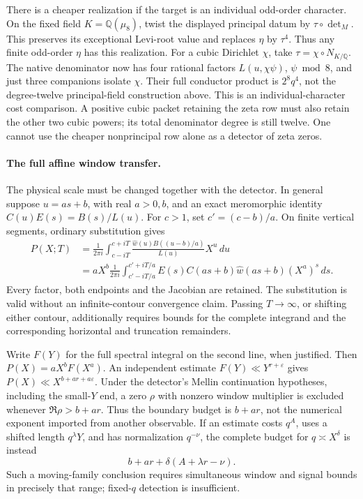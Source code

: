 There is a cheaper realization if the target is an individual
odd-order character. On the fixed field \(K=\mathbb Q(\mu_8)\),
twist the displayed principal datum by \(\tau\circ\det_M\).
This preserves its exceptional Levi-root value and replaces \(\eta\)
by \(\tau^4\). Thus any finite odd-order \(\eta\) has this realization.
For a cubic Dirichlet \(\chi\), take
\(\tau=\chi\circ N_{K/\mathbb Q}\). The native denominator now has
four rational factors \(L(u,\chi\psi)\), \(\psi\bmod8\), and just
three companions isolate \(\chi\). Their full conductor product is
\(2^8q^4\), not the degree-twelve principal-field construction above.
This is an individual-character cost comparison. A positive cubic
packet retaining the zeta row must also retain the other two cubic
powers; its total denominator degree is still twelve. One cannot use
the cheaper nonprincipal row alone as a detector of zeta zeros.

\paragraph{The full affine window transfer.}
The physical scale must be changed together with the detector.
In general suppose \(u=as+b\), with real \(a>0,b\), and an exact
meromorphic identity \(C(u)E(s)=B(s)/L(u)\).
For \(c>1\), set \(c'=(c-b)/a\). On finite vertical segments,
ordinary substitution gives
\begin{align*}
 P(X;T)&=\frac1{2\pi i}\int_{c-iT}^{c+iT}
    \frac{\widehat w(u)B((u-b)/a)}{L(u)}X^u\,du\\
 &=aX^b\frac1{2\pi i}
   \int_{c'-iT/a}^{c'+iT/a}
      E(s)C(as+b)\widehat w(as+b)(X^a)^s\,ds.
\end{align*}
Every factor, both endpoints and the Jacobian are retained.
The substitution is valid without an infinite-contour convergence
claim. Passing \(T\to\infty\), or shifting either contour, additionally
requires bounds for the complete integrand and the corresponding
horizontal and truncation remainders.

Write \(F(Y)\) for the full spectral integral on the second line,
when justified. Then \(P(X)=aX^bF(X^a)\).
An independent estimate \(F(Y)\ll Y^{r+\varepsilon}\) gives
\(P(X)\ll X^{b+ar+a\varepsilon}\). Under the detector's Mellin
continuation hypotheses, including the small-\(Y\) end, a zero
\(\rho\) with nonzero window multiplier is excluded whenever
\(\Re\rho>b+ar\). Thus the boundary budget is \(b+ar\), not
the numerical exponent imported from another observable.
If an estimate costs \(q^A\), uses a shifted length \(q^\lambda Y\),
and has normalization \(q^{-\nu}\), the complete budget for
\(q\asymp X^\delta\) is instead
\[
 b+ar+\delta(A+\lambda r-\nu).
\]
Such a moving-family conclusion requires simultaneous window and
signal bounds in precisely that range; fixed-\(q\) detection is
insufficient.

